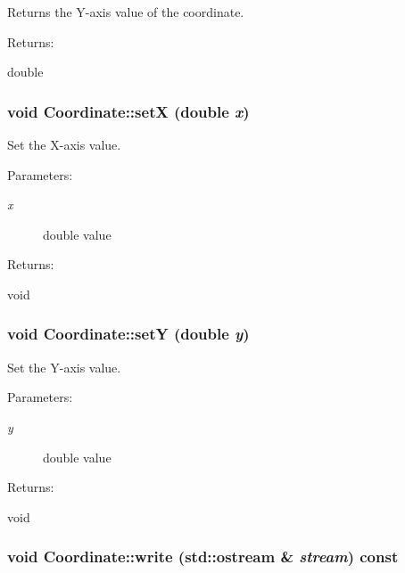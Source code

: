 Returns the Y-axis value of the coordinate. \begin{Desc}
\item[Returns: ]\par
double \end{Desc}
\subsubsection{\setlength{\rightskip}{0pt plus 5cm}void Coordinate::set\-X (double {\em x})\hspace{0.3cm}{\tt  [inline]}}\label{classCoordinate_a3}


Set the X-axis value. \begin{Desc}
\item[Parameters: ]\par
\begin{description}
\item[{\em 
x}]double value \end{description}
\end{Desc}
\begin{Desc}
\item[Returns: ]\par
void \end{Desc}
\subsubsection{\setlength{\rightskip}{0pt plus 5cm}void Coordinate::set\-Y (double {\em y})\hspace{0.3cm}{\tt  [inline]}}\label{classCoordinate_a4}


Set the Y-axis value. \begin{Desc}
\item[Parameters: ]\par
\begin{description}
\item[{\em 
y}]double value \end{description}
\end{Desc}
\begin{Desc}
\item[Returns: ]\par
void \end{Desc}
\subsubsection{\setlength{\rightskip}{0pt plus 5cm}void Coordinate::write (std::ostream \& {\em stream}) const}\label{classCoordinate_a8}


